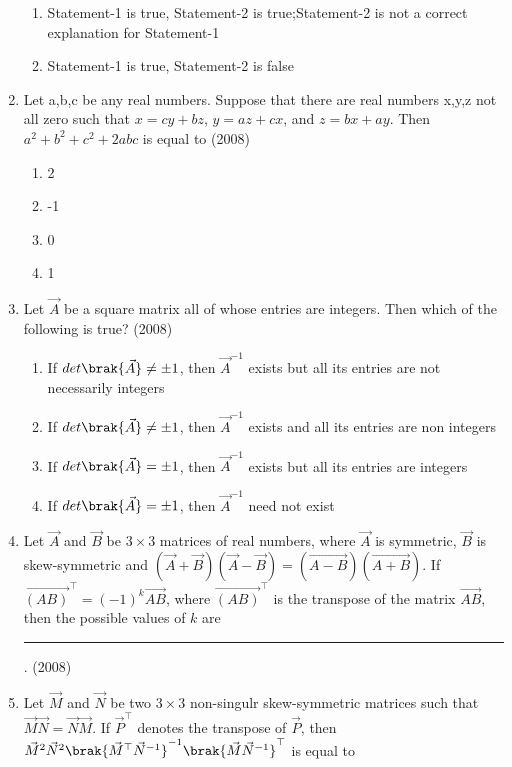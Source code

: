 \begin{enumerate}
\begin{enumerate}
			\item Statement-1 is true, Statement-2 is true;Statement-2 is not a correct explanation for Statement-1
			\item Statement-1 is true, Statement-2 is false
		\end{enumerate}
	\item Let a,b,c be any real numbers. Suppose that there are real numbers x,y,z not all zero such that $x=cy+bz$, $y=az+cx$, and $z=bx+ay$. Then $a^2+b^2+c^2+2abc$ is equal to \hfill{(2008)}
\begin{multicols}{4}
		\begin{enumerate}
			\item 2
			\item -1
			\item 0
			\item 1
		\end{enumerate}
\end{multicols}
	\item Let $\vec{A}$ be a square matrix all of whose entries are integers. Then which of the following is true? \hfill{(2008)}
		\begin{enumerate}
			\item If $det\brak{\vec{A}}\neq\pm1$, then $\vec{A}^{-1}$ exists but all its entries are not necessarily integers
			\item If $det\brak{\vec{A}}\neq\pm1$, then $\vec{A}^{-1}$ exists and all its entries are non integers
			\item If $det\brak{\vec{A}}=\pm1$, then $\vec{A}^{-1}$ exists but all its entries are integers
			\item If $det\brak{\vec{A}}=\pm1$, then $\vec{A}^{-1}$ need not exist
		\end{enumerate}
		\item 
			Let $\vec{A}$ and $\vec{B}$ be $3\times3$ matrices of real numbers, where $\vec{A}$ is symmetric, $\vec{B}$ is skew-symmetric and $(\vec{A}+\vec{B})(\vec{A}-\vec{B})=(\vec{A-B})(\vec{A+B})$. If $\vec{(AB)}^\top=(-1)^k\vec{AB}$, where $\vec{(AB)}^\top$ is the transpose of the matrix $\vec{AB}$, then the possible values of $k$ are 
			\rule{1cm}{0.01pt}.
		\hfill(2008)
    \item 
        Let $\vec{M}$ and $\vec{N}$ be two $3 \times 3$ non-singulr skew-symmetric matrices such that $\vec{M}\vec{N}=\vec{N}\vec{M}$. If $\vec{P}^{\top}$ denotes the transpose of $\vec{P}$, then $\vec{M}^2\vec{N}^2\brak{\vec{M}^{\top}\vec{N}^{-1}}^{-1} \brak{\vec{M}\vec{N}^{-1}}^{\top}$ is equal to 
\begin{multicols}{4}

\end{multicols}
\end{enumerate}
